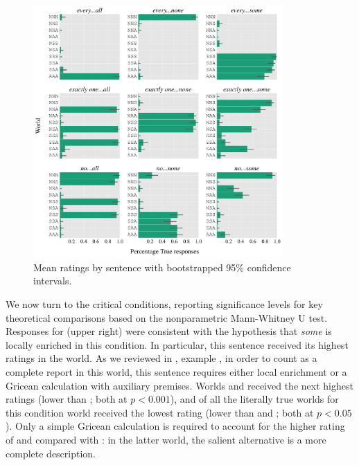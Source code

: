 \documentclass[leqno,12pt]{article}
\begin{document}
\begin{figure}[!ht]
  \centering
  \includegraphics[width=0.85\textwidth]{fig/basketball-binary-version-pilot-4-1-15-results-parsed}
  \caption{Mean ratings by sentence with bootstrapped 95\% confidence intervals.}
  \label{fig:exp1-results}
\end{figure}

We now turn to the critical conditions, reporting significance levels
for key theoretical comparisons based on the nonparametric
Mann-Whitney U test. Responses for  (upper right)
were consistent with the hypothesis that \emph{some} is locally
enriched in this condition. In particular, this sentence received its
highest ratings in the  world. As we reviewed in
, example , in order to
count as a complete report in this world, this sentence requires
either local enrichment or a Gricean calculation with auxiliary
premises. Worlds  and  received the next highest
ratings (lower than ; both at $p<0.001$), and of all the
literally true worlds for this condition world  received
the lowest rating (lower than  and ; both at
$p<0.05$).  Only a simple Gricean calculation is required to account
for the higher rating of  and  compared with
: in the latter world, the salient alternative  is a more complete description.
\end{document}
